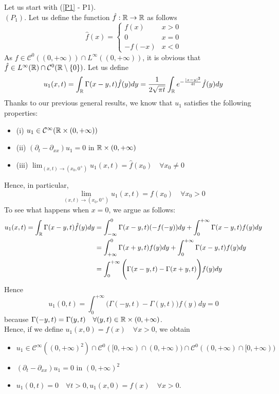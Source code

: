 \begin{ProofBox}
    Let us start with (\ref{P1} - P1).\\
$(P_1)$.  Let us define the function $\hat{f}: \mathbb{R} \rightarrow \mathbb{R}$ as follows
\begin{equation*}
\hat{f}(x) = 
    \begin{cases}
        f(x) & x > 0\\
        0 & x = 0\\
        -f(-x) & x < 0
    \end{cases}
\end{equation*}
As  $f \in \mathcal{C}^0((0,+\infty)) \cap L^\infty((0,+\infty))$, it is obvious that $\hat{f} \in L^\infty(\mathbb{R}) \cap \mathcal{C}^0(\mathbb{R} \setminus \{0\})$. Let us define 
\begin{equation*}
    u_1 (x,t) = \int_{\mathbb{R}} \Gamma(x-y, t) \hat{f}(y) dy = \frac{1}{2 \sqrt{\pi t}} \int_{\mathbb{R}} e^{-\frac{|x-y|^2} {4t}} \hat{f}(y) dy 
\end{equation*}
Thanks to our previous general results, we know that $u_1$ satisfies the following properties:
\begin{itemize}
    \item (i) $u_1 \in \mathcal{C}^\infty(\mathbb{R} \times (0,+\infty))$
    \item (ii) $(\partial_t - \partial_{xx}) u_1 = 0$ in $\mathbb{R} \times (0,+\infty)$
    \item (iii) $\lim_{(x,t) \rightarrow (x_0,0^+)}u_1(x,t) = \hat{f}(x_0) \quad \forall x_0 \neq 0$
\end{itemize}
Hence, in particular,
\begin{equation*}
\lim_{(x,t) \rightarrow (x_0,0^+)}u_1(x,t) = f(x_0) \quad \forall x_0 > 0   
\end{equation*}
To see what happens when $x = 0$, we argue as follows:
\begin{align*}
    u_1(x,t) = \int_{\mathbb{R}} \Gamma(x-y,t) \hat{f}(y) dy &= \int_{- \infty}^0 \Gamma(x-y, t) (-f(-y)) dy + \int_0^{+\infty} \Gamma(x-y, t) f(y) dy \\
    &= \int_{+\infty}^0 \Gamma(x+y, t) f(y) dy + \int_0^{+\infty} \Gamma(x-y, t) f(y) dy \\
    &= \int_0^{+\infty} \Bigg(\Gamma(x-y, t) - \Gamma(x+y, t) \Bigg) f(y) dy 
\end{align*}
Hence
\begin{equation*}
    u_1(0,t) = \int_0^{+\infty} \Bigg(\Gamma(-y,t) - \Gamma(y,t)) f(y) dy = 0
\end{equation*}
because $\Gamma(-y,t) = \Gamma(y,t) \quad \forall (y,t) \in \mathbb{R} \times (0,+\infty)$. \\
Hence, if we define $u_1(x,0) = f(x) \quad \forall x > 0$, we obtain
\begin{itemize}
    \item $u_1 \in \mathcal{C}^\infty((0,+\infty)^2) \cap \mathcal{C}^0([0,+\infty) \cap (0,+\infty)) \cap \mathcal{C}^0((0,+\infty) \cap [0,+\infty))$
    \item $(\partial_t - \partial_{xx}) u_1 = 0$ in $(0,+\infty)^2$
    \item $u_1(0,t) = 0 \quad \forall t > 0, u_1 (x,0) = f(x) \quad \forall x > 0$.
\end{itemize}
\end{ProofBox}
